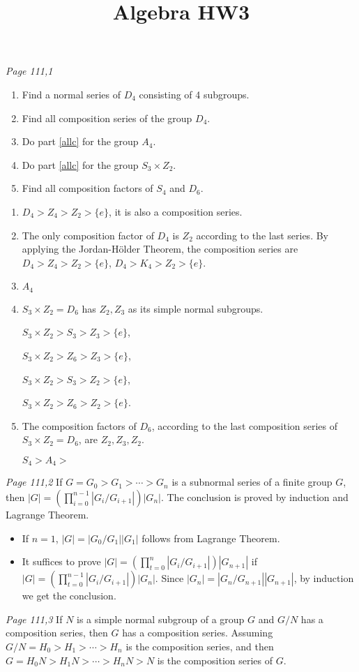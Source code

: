 

\title{Algebra HW3}
\author{\asemail}
\maketitle

\begin{enumerate}
\isep[1em]

\prob
	\textit{Page 111,1} 
	\begin{enumerate}
		\item Find a normal series of $D_4$ consisting of 4 subgroups.
		\item Find all composition series of the group $D_4$. \label{allc}
		\item Do part \eqref{allc}  for the group $A_4$.
		\item Do part \eqref{allc}  for the group $S_3\times Z_2$.
		\item Find all composition factors of $S_4$ and $D_6$. 
	\end{enumerate}
\soln
\begin{enumerate}
	\item $D_4>Z_4>Z_2>\{e\}$, it is also a composition series.
	\item The only composition factor of $D_4$ is $Z_2$ according to the last series. By applying the Jordan-H\"{o}lder Theorem, the composition series are $D_4>Z_4>Z_2>\{e\}$, $D_4>K_4>Z_2>\{e\}$.
	\item $A_4$
	\item $S_3\times Z_2=D_6$ has $Z_2,Z_3$ as its simple normal subgroups.

	$S_3\times Z_2>S_3>Z_3>\{e\}$,

	$S_3\times Z_2>Z_6>Z_3>\{e\}$,

	$S_3\times Z_2>S_3>Z_2>\{e\}$, 
	
	$S_3\times Z_2>Z_6>Z_2>\{e\}$.
	\item The composition factors of $D_6$, according to the last composition series of $S_3\times Z_2=D_6$, are $Z_2,Z_3,Z_2$.

	$S_4>A_4> $
\end{enumerate}
\prob \textit{Page 111,2}
	If $G=G_0>G_1>\cdots>G_n$ is a subnormal series of a finite group $G$, then 
	$|G|=\left(\prod\limits_{i=0}^{n-1}|G_i/G_{i+1}|\right)|G_n|$.
	\label{seriprod}
\soln The conclusion is proved by induction and Lagrange Theorem.
	\begin{itemize}
		\item If $n=1$, $|G|=|G_0/G_1||G_1|$ follows from Lagrange Theorem.
		\item It suffices to prove 
	$|G|=\left(\prod\limits_{t=0}^{n}|G_i/G_{i+1}|\right)|G_{n+1}|$ if 
	$|G|=\left(\prod\limits_{t=0}^{n-1}|G_i/G_{i+1}|\right)|G_n|$. Since $|G_n|=|G_n/G_{n+1}||G_{n+1}|$, by induction we get the conclusion.
	\end{itemize}
\prob\textit{Page 111,3} If $N$ is a simple normal subgroup of a group $G$ and $G/N$ has a composition series, then $G$ has a composition series.
\soln
Assuming 
$G/N=H_0>H_1>\cdots>H_n$ 
is the composition series, and then 
$G=H_0N>H_1N>\cdots>H_nN>N$ is the composition series of $G$. 


\end{enumerate}

